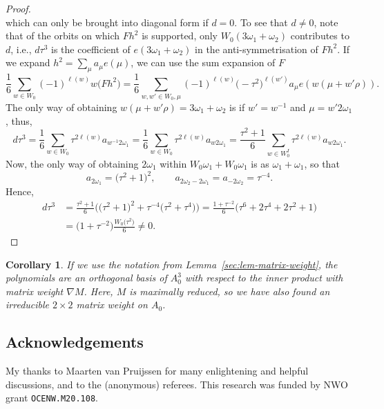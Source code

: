 \documentclass[pdftex]{sigma}
\newtheorem{Corollary}[Theorem]{Corollary}
\theoremstyle{definition}
\numberwithin{equation}{section}
\begin{document}
\begin{proof}
\[ \]
 which can only be brought into diagonal form if $d=0$. To see that $d\ne0$,
 note that of the orbits on which $Fh^2$ is supported, only $W_0(3\omega_1+\omega_2)$ contributes to $d$, i.e., $d\tau^3$ is the coefficient of $e(3\omega_1+\omega_2)$ in the anti-symmetrisation of $Fh^2$. If we expand
$
 h^2 = \sum_\mu a_\mu e(\mu)$,
 we can use the sum expansion of $F$
 \[
 \frac{1}{6}\sum_{w\in W_0} (-1)^{\ell(w)} w\bigl(Fh^2\bigr)
 = \frac{1}{6}\sum_{w,w'\in W_0,\mu} (-1)^{\ell(w)} \bigl(-\tau^2\bigr)^{\ell(w')}
 a_\mu e(w(\mu + w'\rho)).
 \]
 The only way of obtaining $w(\mu + w'\rho)=3\omega_1+\omega_2$ is if
 $w'=w^{-1}$ and $\mu=w'2\omega_1$, thus,
 \[
 d\tau^3 = \frac{1}{6}\sum_{w\in W_0} \tau^{2\ell(w)}
 a_{w^{-1}2\omega_1}
 = \frac{1}{6}\sum_{w\in W_0} \tau^{2\ell(w)} a_{w2\omega_1}
 = \frac{\tau^2+1}{6}\sum_{w\in W_0^I} \tau^{2\ell(w)} a_{w2\omega_1}.
 \]
 Now, the only way of obtaining $2\omega_1$ within $W_0\omega_1+W_0\omega_1$
 is as $\omega_1+\omega_1$, so that
 \[
 a_{2\omega_1} = \bigl(\tau^2+1\bigr)^2,\qquad
 a_{2\omega_2-2\omega_1} = a_{-2\omega_2} = \tau^{-4}.
 \]
 Hence,
 \begin{align*}
 d\tau^3 &= \frac{\tau^2+1}{6}\bigl(\bigl(\tau^2+1\bigr)^2 + \tau^{-4}\bigl(\tau^2+\tau^4\bigr)\bigr)
 = \frac{1+\tau^{-2}}{6} \bigl(\tau^6 + 2\tau^4 + 2\tau^2 + 1\bigr)\\
 &= \bigl(1+\tau^{-2}\bigr)\frac{W_0\bigl(\tau^2\bigr)}{6}\ne0.\tag*{\qed}
 \end{align*} \renewcommand{\qed}{}
\end{proof}

\begin{Corollary}
 If we use the notation from Lemma~{\rm\ref{sec:lem-matrix-weight}}, the polynomials
  are an orthogonal basis of
 $A_0^3$ with respect to the inner product with matrix weight $\nabla M$.
 Here, $M$ is maximally reduced, so we have also found an irreducible $2\times 2$ matrix weight
 on $A_0$.
\end{Corollary}

\subsection*{Acknowledgements}
My thanks to Maarten van Pruijssen for many enlightening and helpful discussions, and to the (anonymous) referees. This research was funded by NWO grant \texttt{OCENW.M20.108}.
\end{document}
